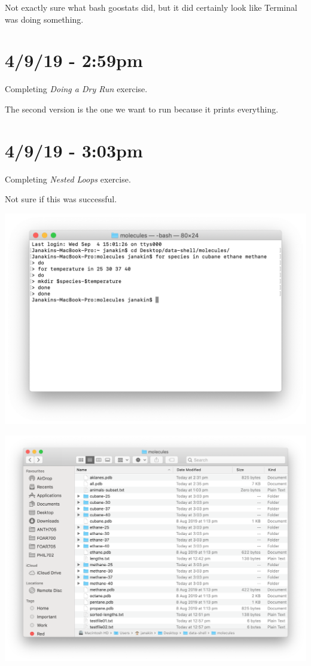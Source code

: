 \documentclass{article}
\begin{document}
Not exactly sure what bash goostats did, but it did certainly look like Terminal was doing something.

\section*{4/9/19 - 2:59pm}

Completing \textit{Doing a Dry Run} exercise.

The second version is the one we want to run because it prints everything.

\section*{4/9/19 - 3:03pm}

Completing \textit{Nested Loops} exercise.

Not sure if this was successful.

\includegraphics[width=\textwidth]{figs.png}

\includegraphics[width=\textwidth]{figt.png}
\end{document}
